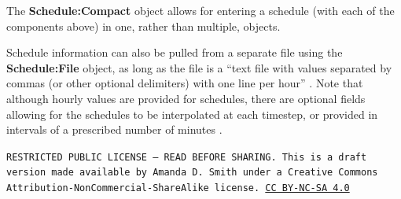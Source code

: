 \documentclass[10pt]{article}
\begin{document}
The \textbf{Schedule:Compact} object allows for entering a schedule (with each of the components above) in one, rather than multiple, objects.

Schedule information can also be pulled from a separate file using the \textbf{Schedule:File} object, as long as the file is a ``text file with values separated by commas (or other
optional delimiters) with one line per hour'' \cite{EPdocs9inputoutput}. Note that although hourly values are provided for schedules, there are optional fields allowing for the schedules to be interpolated at each timestep, or provided in intervals of a prescribed number of minutes \cite{EPdocs9inputoutput}.


\bigskip

\noindent
\texttt{\footnotesize RESTRICTED PUBLIC LICENSE --- READ BEFORE SHARING. This is a draft version made available by Amanda D. Smith under a Creative Commons Attribution-NonCommercial-ShareAlike license. 
\href{https://creativecommons.org/licenses/by-nc-sa/4.0/}{CC BY-NC-SA 4.0}}


\printbibliography
\end{document}
